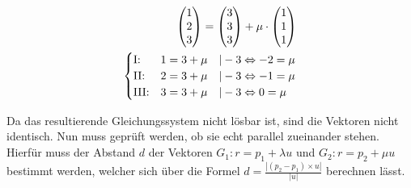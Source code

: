 \begin{align*}
    \begin{pmatrix}
        1 \\ 2 \\ 3
    \end{pmatrix} = \begin{pmatrix}
                        3 \\ 3 \\ 3
                    \end{pmatrix} + \mu \cdot \begin{pmatrix}
                                                  1 \\ 1 \\ 1
                                              \end{pmatrix} \\
    \begin{cases}
        \text{I:\@}   & 1 = 3 + \mu \quad | -3 \Leftrightarrow -2 = \mu \\
        \text{II:\@}  & 2 = 3 + \mu \quad | -3 \Leftrightarrow -1 = \mu \\
        \text{III:\@} & 3 = 3 + \mu \quad | -3 \Leftrightarrow 0 = \mu
    \end{cases}
\end{align*}

Da das resultierende Gleichungssystem nicht lösbar ist, sind die Vektoren nicht
identisch. Nun muss geprüft werden, ob sie echt parallel zueinander stehen.
Hierfür muss der Abstand $d$ der Vektoren $G_1: r = p_1 + \lambda u$ und $G_2:
    r = p_2 + \mu u$ bestimmt werden, welcher sich über die Formel $d = \frac{|(p_2
        - p_1) \times u|}{|u|}$ berechnen lässt.

